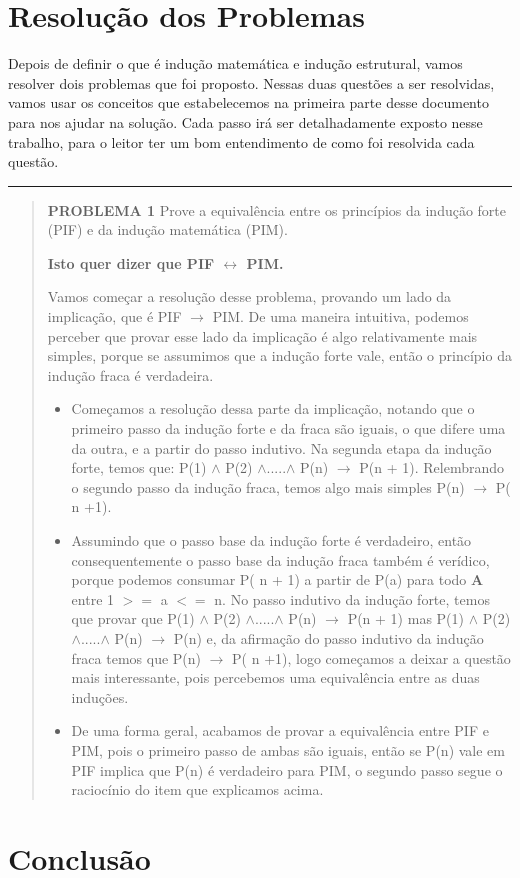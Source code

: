 \documentclass[a4paper, 10pt]{article}
\begin{document}
\section{Resolução dos Problemas}
Depois de definir o que é indução matemática e indução estrutural, vamos resolver dois problemas que foi proposto. Nessas duas questões a ser resolvidas, vamos usar os conceitos que estabelecemos na primeira parte desse documento para nos ajudar na solução. Cada passo irá ser detalhadamente exposto nesse trabalho, para o leitor ter um bom entendimento de como foi resolvida cada questão.
\hrule
\begin{quote}
        \textbf{PROBLEMA 1}
       Prove a equivalência entre os princípios da indução forte (PIF) e da indução matemática (PIM).
        
        \textbf{Isto quer dizer que PIF $\leftrightarrow$ PIM.}
       
       
        Vamos começar a resolução desse problema, provando um lado da implicação, que é PIF $\to$ PIM. De uma maneira intuitiva, podemos perceber que provar esse lado da implicação é algo relativamente mais simples, porque se assumimos que a indução forte vale, então o princípio da indução fraca é verdadeira.
        \begin{itemize}
            \item Começamos a resolução dessa parte da implicação, notando que o primeiro passo da indução forte e da fraca são iguais, o que difere uma da outra, e a partir do passo indutivo. Na segunda etapa da indução forte, temos que: P(1) $\wedge$ P(2) $\wedge$.....$\wedge$ P(n) $\to$ P(n + 1). Relembrando o segundo passo da indução fraca, temos algo mais simples P(n) $\to$ P( n +1).
            
            \item Assumindo que o passo base da indução forte é verdadeiro, então consequentemente o passo base da indução fraca também é verídico, porque podemos consumar P( n + 1) a partir de P(a) para todo \textbf{A} entre 1 $>=$ a $<=$ n. No passo indutivo da indução forte, temos que provar que P(1) $\wedge$ P(2) $\wedge$.....$\wedge$ P(n) $\to$ P(n + 1) mas P(1) $\wedge$ P(2) $\wedge$.....$\wedge$ P(n) $\to$ P(n) e, da afirmação do passo indutivo da indução fraca temos que  P(n) $\to$ P( n +1), logo começamos a deixar a questão mais interessante, pois percebemos uma equivalência entre as duas induções. 
            \item De uma forma geral, acabamos de provar a equivalência entre PIF e PIM, pois o primeiro passo de ambas são iguais, então se P(n) vale em PIF implica que P(n) é verdadeiro para PIM, o segundo passo segue o raciocínio do item que explicamos acima. 
        \end{itemize}
    \end{quote}



\section{Conclusão}
\end{document}
